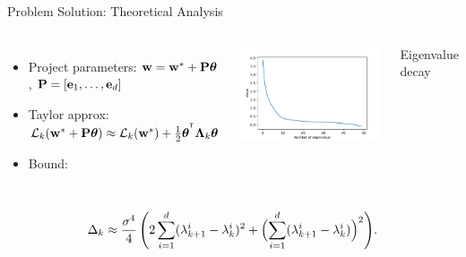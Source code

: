 \documentclass{beamer}
\begin{document}
\begin{frame}{Problem Solution: Theoretical Analysis}
    \begin{columns}[c]
        \begin{itemize}
            \item Project parameters: $\mathbf{w} = \mathbf{w}^* + \mathbf{P} \boldsymbol{\theta}$, $\mathbf{P} = [\mathbf{e}_1, \dots, \mathbf{e}_d]$
            \item Taylor approx: $\mathcal{L}_k (\mathbf{w}^* + \mathbf{P} \boldsymbol{\theta}) \approx \mathcal{L}_k (\mathbf{w}^*) + \tfrac12 \boldsymbol{\theta}^{^{\text{\tiny\sffamily\upshape\mdseries T}}} \boldsymbol{\Lambda}_k \boldsymbol{\theta}$
                  \bigskip
            \item Bound:
        \end{itemize}
        \includegraphics[width=1.0\textwidth]{img/eigenvalues.pdf}
        \vspace{0.5cm}\hspace{1.8cm}\raggedright{\tiny Eigenvalue decay}
    \end{columns}
    $$
        \Delta_k \approx
        \frac{\sigma^4}{4}\,\Biggl(2 \sum_{i=1}^d (\lambda_{k+1}^i - \lambda_k^i)^2
        + \Bigl(\sum_{i=1}^d (\lambda_{k+1}^i - \lambda_k^i)\Bigr)^2\Biggr).
    $$
\end{frame}
\end{document}
